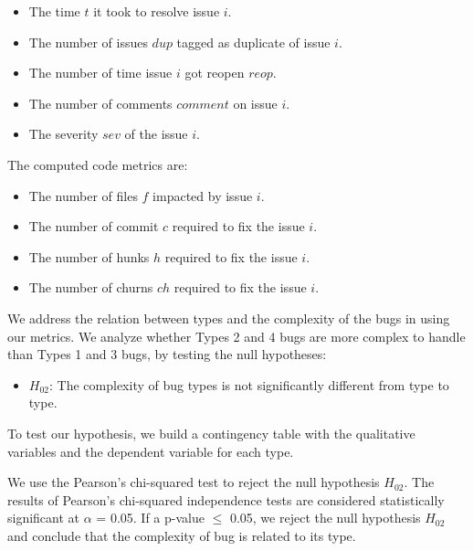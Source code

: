 \begin{itemize}
  \item The time $t$ it took to resolve issue $i$.
  \item The number of issues $dup$ tagged as duplicate of issue $i$.
  \item The number of time issue $i$ got reopen $reop$.
  \item The number of comments $comment$ on issue $i$.
  \item The severity $sev$ of the issue $i$.
\end{itemize}

The computed code metrics are:

\begin{itemize}
  \item The number of files $f$ impacted by issue $i$.
  \item The number of commit $c$ required to fix the issue $i$.
  \item The number of hunks $h$ required to fix the issue $i$.
  \item The number of churns $ch$ required to fix the issue $i$.
\end{itemize}


We address the relation between types and the complexity of the bugs in using our metrics.
We analyze whether Types 2 and 4 bugs are more complex to handle than Types 1 and 3 bugs, by testing the null hypotheses:

\begin{itemize}
 \item  $H_{02}$:  The complexity of bug types is not significantly different from type to type.
\end{itemize}

To test our hypothesis, we build a contingency table with the qualitative variables and the dependent variable for each type.

We use the Pearson's chi-squared test to reject the null hypothesis $H_{02}$.
The results of Pearson's chi-squared independence tests are considered statistically significant at $\alpha$ = 0.05.
If a p-value $\le$ 0.05, we reject the null hypothesis $H_{02}$ and conclude that the complexity of bug is related to its type.



